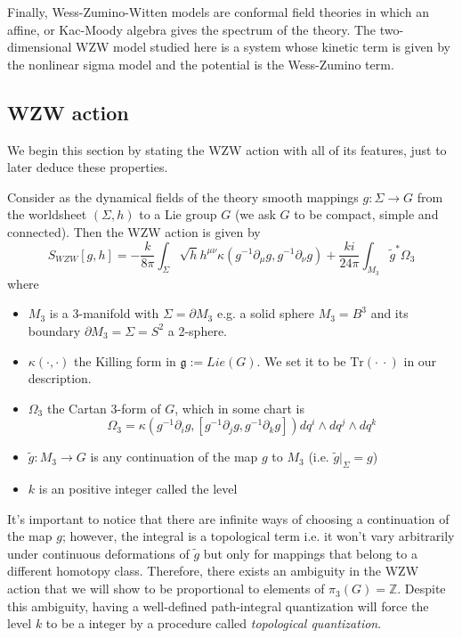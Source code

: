 \documentclass[a4paper,12pt]{article}
\numberwithin{equation}{section}
\numberwithin{thm}{section}
\numberwithin{exm}{section}
\newcommand{\p}{\partial}
\newcommand{\tr}{\mathrm{Tr}}
\newcommand{\wt}{\widetilde}
\newcommand{\mo}{^{-1}}
\newcommand{\Z}{{\mathbb Z}}
\newcommand{\we}{{\wedge}}
\newcommand{\<}{{\langle}}
\renewcommand{\>}{{\rangle}}
\renewcommand{\k}{{\kappa}}
\newcommand{\m}{{\mu}}
\newcommand{\n}{{\nu}}
\newcommand{\Om}{{\Omega}}
\renewcommand{\S}{{\Sigma}}
\begin{document}
Finally, Wess-Zumino-Witten models are conformal field theories in which an affine, or Kac-Moody algebra gives the spectrum of the theory. The two-dimensional WZW model studied here is a system whose kinetic term is given by the nonlinear sigma model and the potential is the Wess-Zumino term.


\subsection{WZW action}
We begin this section by stating the WZW action with all of its features, just to later deduce these properties.

Consider as the dynamical fields of the theory smooth mappings $g:\S\rightarrow G$ from the worldsheet $(\S,h)$ to a Lie group $G$ (we ask $G$ to be compact, simple and connected). Then the WZW action is given by
	\begin{equation}
	S_{WZW}[g,h] = - \frac{k}{8\pi}\int_{\S}\sqrt{h}h^{\m\n} \k(g\mo\p_\mu g, g\mo\p_\n g) + \frac{k i}{24\pi}\int_{M_3} \wt{g}^* \Om_3
	\end{equation}
where
	\begin{itemize}
	\item $M_3$ is a 3-manifold with $\S = \p M_3$ e.g. a solid sphere $M_3 = B^3$ and  its boundary $\p M_3 = \S = S^2$ a 2-sphere.
	\item $\k(\cdot,\cdot)$ the Killing form in ${\mathfrak g} := Lie(G)$. We set it to be $\tr(\cdot\ \cdot)$ in our description.
	\item $\Om_3$ the Cartan 3-form of $G$, which in some chart is
		\begin{equation}
		\Om_3 = \k(g\mo \p_i g,[g\mo \p_j g, g\mo \p_k g]) dq^i\we dq^j \we dq^k
		\end{equation}
	\item $\wt g :M_3\rightarrow G$ is any continuation of the map $g$ to $M_3$ (i.e. $\wt g|_{\S} = g$)
	\item $k$ is an positive integer called the level
	\end{itemize}

It's important to notice that there are infinite ways of choosing a continuation of the map $g$; however, the integral is a topological term i.e. it won't vary arbitrarily under continuous deformations of $\wt g$ but only for mappings that belong to a different homotopy class. Therefore, there exists an ambiguity in the WZW action that we will show to be proportional to elements of $\pi_3(G) = \Z$. Despite this ambiguity, having a well-defined path-integral quantization will force the level $k$ to be a integer by a procedure called {\it topological quantization}. 
\end{document}
